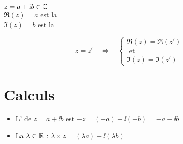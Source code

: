 \begin{frame}

\hspace{2em}
\begin{minipage}{0.5\linewidth}
$z = a + \mathrm{i} b \in \mathbb{C}$ \\[0.5em]
$\Re(z) = a$ est la   \\[0.5em]
$\Im(z) = b$ est la 
\end{minipage}%
\pause
\hspace{-1em}
\begin{minipage}{0.2\linewidth}
\end{minipage}
\pause
$$ z = z'\quad \Longleftrightarrow \quad \left\{ \begin{array}{l}
     \Re (z) = \Re (z')\\
     \text{ et }\\
     \Im (z) = \Im (z')
   \end{array} \right. $$


\end{frame}

\section{Calculs}

\begin{frame}
\begin{itemize}
  \item L' de $z = a + \ii b$ est $- z = (- a) + \ii (-b) = - a - \ii b$
  
  \item La  $\lambda \in \mathbb{R}$ : $\lambda \times 
  z = (\lambda a) + \ii(\lambda b)$
\end{itemize}

\bigskip

\end{frame}


